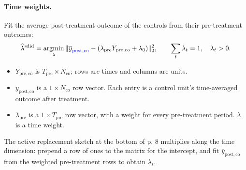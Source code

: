 \documentclass[11pt,a4paper]{article}
\begin{document}
\paragraph{Time weights.}
Fit the average post-treatment outcome of the controls from their pre-treatment outcomes:
\[
\widehat\lambda^{\mathrm{sdid}}
=\operatorname*{argmin}_{\lambda}
\|\overline y_{\textcolor{blue}{\mathrm{post,co}}}
-(\lambda_{\mathrm{pre}}Y_{\mathrm{pre,co}}+\lambda_0)\|_2^2,
\qquad \sum_t\lambda_t=1,\quad\lambda_t>0.
\]
\begin{itemize}
\item \(Y_{\mathrm{pre,co}}\) is \(T_{\mathrm{pre}}\times N_{\mathrm{co}}\); rows are times and columns are units.
\item \(\overline y_{\mathrm{post,co}}\) is a \(1\times N_{\mathrm{co}}\) row vector. Each entry is a control unit's time-averaged outcome after treatment.
\item \(\lambda_{\mathrm{pre}}\) is a \(1\times T_{\mathrm{pre}}\) row vector, with a weight for every pre-treatment period. \(\lambda\) is a time weight.
\end{itemize}
The active replacement sketch at the bottom of p. 8 multiplies along the time dimension: prepend a row of ones to the matrix for the intercept, and fit \(\overline y_{\mathrm{post,co}}\) from the weighted pre-treatment rows to obtain \(\lambda_t\).
\begin{center}
\end{center}
\end{document}
